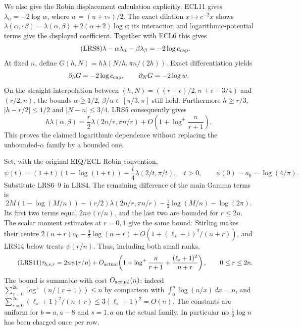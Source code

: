 \documentclass[11pt,a4paper]{article}
\begin{document}
We also give the Robin displacement calculation explicitly.
ECL11 gives $\lambda_\alpha=-2\log w$, where $w=(u+v_*)/2$.
The exact dilation $x\mapsto c^{-2}x$ shows
$\lambda(\alpha,c\beta)=\lambda(\alpha,\beta)
 +2(\alpha+2)\log c$; its interaction and logarithmic-potential
terms give the displayed coefficient.  Together with ECL6 this gives
\begin{equation}\tag{LRS8}
 \lambda-\alpha\lambda_\alpha-\beta\lambda_\beta
    =-2\log c_{\rm cap}.
\end{equation}
At fixed $n$, define
$G(h,N)=h\lambda(N/h,\pi n/(2h))$.  Exact differentiation yields
\[
 \partial_hG=-2\log c_{\rm cap},\qquad
 \partial_NG=-2\log w.
\]
On the straight interpolation between
$(h,N)=((r-\epsilon)/2,n+\epsilon-3/4)$ and $(r/2,n)$,
the bounds $\alpha\ge1/2$, $\beta/\alpha\in[\pi/3,\pi]$ still hold.
Furthermore $h\ge r/3$, $|h-r/2|\le1/2$ and $|N-n|\le3/4$.
LRS5 consequently gives
\begin{equation}\tag{LRS9}
 h\lambda(\alpha,\beta)
 =\frac r2\lambda(2n/r,\pi n/r)
   +O\!\left(1+\log^+\frac{n}{r+1}\right).
\end{equation}
This proves the claimed logarithmic dependence without replacing the
unbounded-$\alpha$ family by a bounded one.

Set, with the original EIQ/ECL Robin convention,
\begin{equation}\tag{LRS10}
 \psi(t)=(1+t)(1-\log(1+t))
               -\frac t4\lambda(2/t,\pi/t),\quad t>0,
 \qquad \psi(0)=a_0=\log(4/\pi).
\end{equation}
Substitute LRS6--9 in LRS4.  The remaining difference of the main
Gamma terms is
\[
 2M(1-\log(M/n))-(r/2)\lambda(2n/r,\pi n/r)
      -\tfrac12\log(M/n)-\log(2\pi).
\]
Its first two terms equal $2n\psi(r/n)$, and the last two are bounded
for $r\le2n$.  The scalar moment estimates at $r=0,1$ give the same
bound: Stirling makes their centre
$2(n+r)a_0-\tfrac12\log(n+r)+O(1+(\ell_s+1)^2/(n+r))$,
and LRS14 below treats $\psi(r/n)$.  Thus, including both small ranks,
\begin{equation}\tag{LRS11}
 \tau_{b,s,r}=2n\psi(r/n)
 +O_{\rm actual}\!\left(1+\log^+\frac{n}{r+1}
                         +\frac{(\ell_s+1)^2}{n+r}\right),
 \qquad 0\le r\le2n.
\end{equation}
The bound is summable with cost $O_{\rm actual}(n)$: indeed
$\sum_{r=0}^{2n}\log^+(n/(r+1))\le n$ by comparison with
$\int_0^n\log(n/x)\,dx=n$, and
$\sum_{r=0}^{2n}(\ell_s+1)^2/(n+r)\le3(\ell_s+1)^2=O(n)$.
The constants are uniform for $b=a,a-8$ and $s=1,a$ on the actual
family.  In particular no $\tfrac12\log n$ has been charged once
per row.
\end{document}
